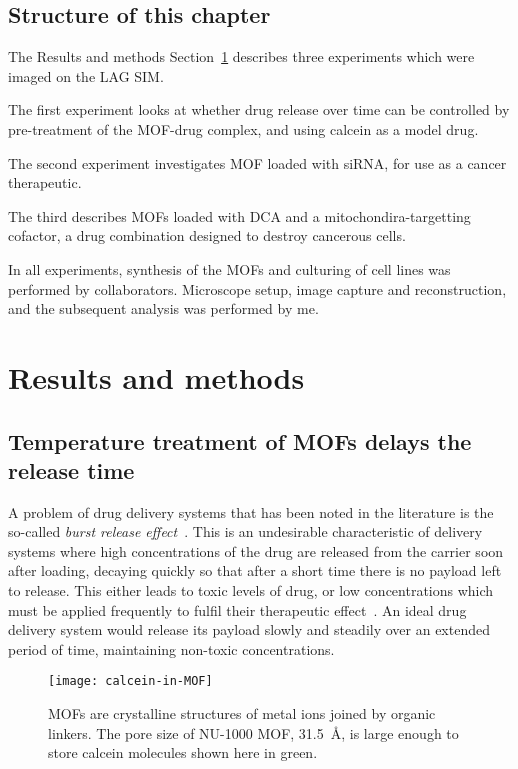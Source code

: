 \subsection{Structure of this chapter}
The Results and methods Section~\ref{sec:mofmethods} describes three experiments which were imaged on the LAG SIM. 

The first experiment looks at whether drug release over time can be controlled by pre-treatment of the MOF-drug complex, and using calcein as a model drug. 

The second experiment investigates MOF loaded with siRNA, for use as a cancer therapeutic.
 
The third describes MOFs loaded with DCA and a mitochondira-targetting cofactor, a drug combination designed to destroy cancerous cells. 

In all experiments, synthesis of the MOFs and culturing of cell lines was performed by collaborators. 
Microscope setup, image capture and reconstruction, and the subsequent analysis was performed by me. 

\section{Results and methods} \label{sec:mofmethods}

\subsection{Temperature treatment of MOFs delays the release time} \label{sec:mof-temperature}
A problem of drug delivery systems that has been noted in the literature is the so-called \textit{burst release effect}~\cite{huang2001importance}.
This is an undesirable characteristic of delivery systems where high concentrations of the drug are released from the carrier soon after loading, decaying quickly so that after a short time there is no payload left to release. 
This either leads to toxic levels of drug, or low concentrations which must be applied frequently to fulfil their therapeutic effect~\cite{fu2010drug}. 
An ideal drug delivery system would release its payload slowly and steadily over an extended period of time, maintaining non-toxic concentrations. 

\begin{figure}[htbp!]
\centering
\texttt{[image: calcein-in-MOF]}
\caption[MOFs: The NU-1000 MOF has a large pore size to store other molecules]{MOFs are crystalline structures of metal ions joined by organic linkers. The pore size of NU-1000 MOF, \SI{31.5}{\angstrom}, is large enough to store calcein molecules shown here in green.}
\label{fig:calcein-in-MOF}
\end{figure}

